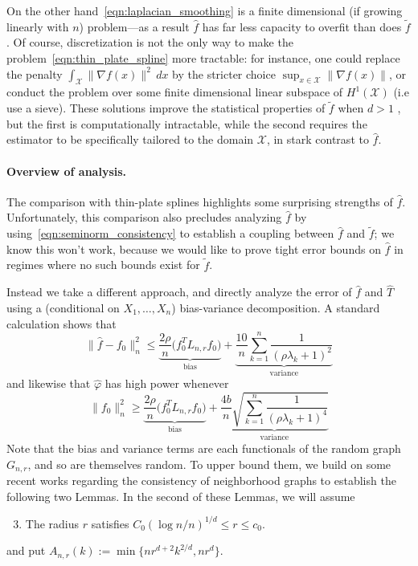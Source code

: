 \documentclass[twoside]{article}
\newcommand{\1}{\mathbf{1}}
\newcommand{\Lap}{L}
\newcommand{\Xset}{\mathcal{X}}
\newcommand{\wt}[1]{\widetilde{#1}}
\newcommand{\wh}[1]{\widehat{#1}}
\theoremstyle{definition}
\theoremstyle{remark}
\begin{document}
On the other hand~\eqref{eqn:laplacian_smoothing} is a finite dimensional (if growing linearly with $n$) problem---as a result $\wh{f}$ has far less capacity to overfit than does $\wt{f}$. Of course, discretization is not the only way to make the problem~\eqref{eqn:thin_plate_spline} more tractable: for instance, one could replace the penalty $\int_{\Xset} \|\nabla f(x)\|^2 \,dx$ by the stricter choice $\sup_{x \in \Xset} \|\nabla f(x)\|$,  or conduct the problem over some finite dimensional linear subspace of $H^1(\Xset)$ (i.e use a sieve). These solutions improve the statistical properties of $\wt{f}$ when $d > 1$ \citep{birge1993,birge1998,vandergeer2000}, but the first is computationally intractable, while the second requires the estimator to be specifically tailored to the domain $\Xset$, in stark contrast to $\wh{f}$.

\paragraph{Overview of analysis.}
The comparison with thin-plate splines highlights some surprising strengths of $\wh{f}$. Unfortunately, this comparison also precludes analyzing $\wh{f}$ by using~\eqref{eqn:seminorm_consistency} to establish a coupling between $\wh{f}$ and $\wt{f}$; we know this won't work, because we would like to prove tight error bounds on $\wh{f}$ in regimes where no such bounds exist for $\wt{f}$.

Instead we take a different approach, and directly analyze the error of $\wh{f}$ and $\wh{T}$ using a (conditional on $X_1,\ldots,X_n$) bias-variance decomposition. A standard calculation shows that
\begin{equation*}
\bigl\|\wh{f} - f_0\bigr\|_n^2 \leq \underbrace{\frac{2\rho}{n} \bigl(f_0^T \Lap_{n,r} f_0\bigr)}_{\textrm{bias}} + \underbrace{\frac{10}{n} \sum_{k = 1}^{n} \frac{1}{(\rho \lambda_k + 1)^2}}_{\textrm{variance}}
\end{equation*}
and likewise that $\wh{\varphi}$ has high power whenever
\begin{equation*}
\bigl\|f_0\bigr\|_n^2 \geq \underbrace{\frac{2\rho}{n} \bigl(f_0^T \Lap_{n,r} f_0\bigr)}_{\textrm{bias}} + \underbrace{\frac{4b}{n} \sqrt{\sum_{k = 1}^{n} \frac{1}{(\rho \lambda_k + 1)^4}}}_{\textrm{variance}}
\end{equation*}
Note that the bias and variance terms are each functionals of the random graph $G_{n,r}$, and so are themselves random. To upper bound them, we build on some recent works \citep{burago2014,trillos2019,calder2019} regarding the consistency of neighborhood graphs to establish the following two Lemmas. In the second of these Lemmas, we will assume
\begin{enumerate}[label=(R\arabic*)]
	\setcounter{enumi}{2}
	\item
	\label{asmp:radius1}
	The radius $r$ satisfies $C_0(\log n/n)^{1/d} \leq r \leq c_0$.
\end{enumerate}
and put $A_{n,r}(k) := \min\{nr^{d + 2}k^{2/d},nr^d\}$.
\end{document}
